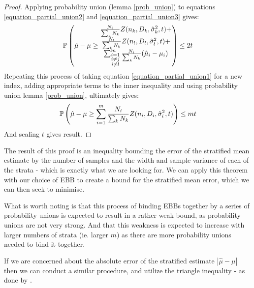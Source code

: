 \begin{proof}
Applying probability union (lemma \ref{prob_union}) to equations \ref{equation_partial_union2} and \ref{equation_partial_union3} gives:
$$ \p\left(\hat{\mu}-\mu \ge \begin{matrix*} \frac{N_i}{\sum_kN_k}Z(n_k,D_k,\hat{\sigma}^2_k,t) +\\ \frac{N_l}{\sum_kN_k}Z(n_l,D_l,\hat{\sigma}^2_l,t) +\\ \sum_{\substack{i=1 \\ i\ne j\\i\ne l}}^m\frac{N_i}{\sum_kN_k}(\hat{\mu}_i-\mu_i)\end{matrix*}\right) \le 2t $$
Repeating this process of taking equation \ref{equation_partial_union1} for a new index, adding appropriate terms to the inner inequality and using probability union lemma \ref{prob_union}, ultimately gives:
$$ \operatorname{\mathbb{P}}\left(\hat{\mu}-\mu \ge \sum_{i=1}^m\frac{N_i}{\sum_kN_k} Z(n_i,D_i,\hat{\sigma}^2_i,t)\right)\le mt $$
And scaling $t$ gives result.
\end{proof}

The result of this proof is an inequality bounding the error of the stratified mean estimate by the number of samples and the width and sample variance of each of the strata - which is exactly what we are looking for.
We can apply this theorem with our choice of EBB to create a bound for the stratified mean error, which we can then seek to minimise.

What is worth noting is that this process of binding EBBs together by a series of probability unions is expected to result in a rather weak bound, as probability unions are not very strong.
And that this weakness is expected to increase with larger numbers of strata (ie. larger $m$) as there are more probability unions needed to bind it together.

If we are concerned about the absolute error of the stratified estimate $|\hat{\mu}-\mu|$ then we can conduct a similar procedure, and utilize the triangle inequality - as done by \cite{2013arXiv1306.4265M}.

